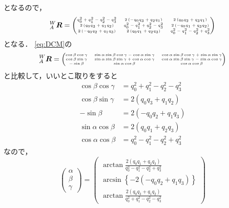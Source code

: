 となるので，
\begin{equation}
  {}^{W}_{A}\boldsymbol{R} =
  {\tiny
    \begin{pmatrix}
      q_0^2+q_1^2-q_2^2-q_3^2 & 2\left(- q_0 q_3 + q_2 q_1\right) & 2\left(q_0 q_2 + q_3 q_1\right)\\
      2\left(q_0 q_3 + q_1 q_2\right) & q_0^2-q_1^2+q_2^2-q_3^2 & 2\left(- q_0 q_1 + q_3 q_2\right)\\
      2\left(- q_0 q_2 + q_1 q_3\right) & 2\left(q_0 q_1 + q_2 q_3\right) & q_0^2-q_1^2-q_2^2+q_3^2
    \end{pmatrix}
  }
\end{equation}
となる．
\autoref{eq:DCM}の
\begin{equation}
  {}^{W}_{A}\boldsymbol{R} = {\tiny \begin{pmatrix}
      \cos \beta \cos \gamma & \sin \alpha \sin \beta \cos \gamma - \cos \alpha \sin \gamma & \cos \alpha \sin \beta \cos \gamma + \sin \alpha \sin \gamma \\
      \cos \beta \sin \gamma & \sin \alpha \sin \beta \sin \gamma + \cos \alpha \cos \gamma & \cos \alpha \sin \beta \sin \gamma - \sin \alpha \cos \gamma \\
      -\sin \beta & \sin \alpha \cos \beta & \cos \alpha \cos \beta
  \end{pmatrix}}
\end{equation}
と比較して，いいとこ取りをすると
\begin{align}
  \cos \beta \cos \gamma &= q_0^2+q_1^2-q_2^2-q_3^2\\
  \cos \beta \sin \gamma &= 2\left(q_0 q_3 + q_1 q_2\right)\\
  -\sin \beta &= 2\left(- q_0 q_2 + q_1 q_3\right)\\
  \sin \alpha \cos \beta &= 2\left(q_0 q_1 + q_2 q_3\right)\\
  \cos \alpha \cos \beta &= q_0^2-q_1^2-q_2^2+q_3^2
\end{align}
なので，
\begin{equation}
  \begin{pmatrix}
    \alpha\\
    \beta\\
    \gamma
  \end{pmatrix} =
  \begin{pmatrix}
    \arctan \frac{2\left(q_0 q_1 + q_2 q_3\right)}{q_0^2-q_1^2-q_2^2+q_3^2}\\
    \arcsin \left\{-2\left(- q_0 q_2 + q_1 q_3\right)\right\}\\
    \arctan \frac{2\left(q_0 q_3 + q_1 q_2\right)}{q_0^2+q_1^2-q_2^2-q_3^2}
  \end{pmatrix}
\end{equation}

